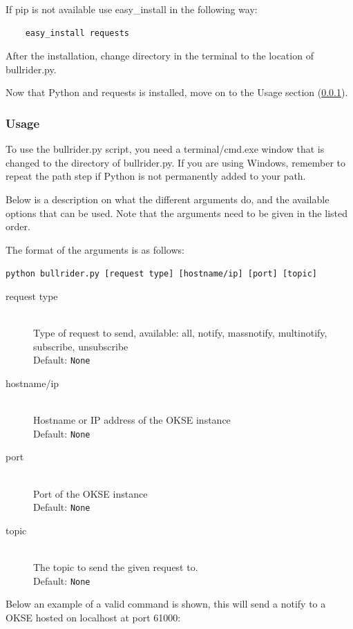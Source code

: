 If pip is not available use easy\_install in the following way:

\begin{verbatim}
    easy_install requests
\end{verbatim}

After the installation, change directory in the terminal to the location of bullrider.py.

Now that Python and requests is installed, move on to the Usage section (\ref{subsubsec:usermanual_Testscripts_usage}).


\subsubsection{Usage}
\label{subsubsec:usermanual_Testscripts_usage}
To use the bullrider.py script, you need a terminal/cmd.exe window that is changed to the directory of bullrider.py. If you are using Windows, remember to repeat the path step if Python is not permanently added to your path. 

Below is a description on what the different arguments do, and the available options that can be used. Note that the arguments need to be given in the listed order.

The format of the arguments is as follows:

\verb!python bullrider.py [request type] [hostname/ip] [port] [topic]!


\begin{description}
    \item[request type] \hfill \\
  Type of request to send, available: all, notify, massnotify, multinotify, subscribe, unsubscribe \hfill \\ Default: \verb!None!
    \item[hostname/ip] \hfill \\
  Hostname or IP address of the OKSE instance \hfill \\ Default: \verb!None!
    \item[port] \hfill \\
  Port of the OKSE instance \hfill \\ Default: \verb!None!
    \item[topic] \hfill \\
  The topic to send the given request to. \hfill \\ Default: \verb!None!
\end{description}
Below an example of a valid command is shown, this will send a notify to a OKSE hosted on localhost at port 61000:

